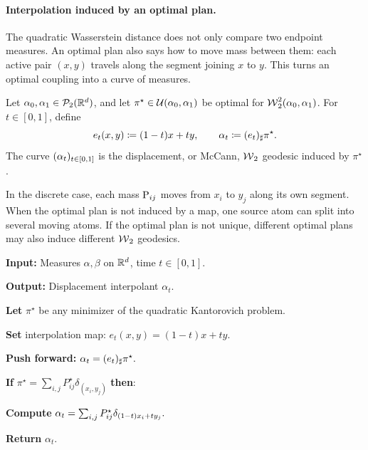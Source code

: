 \paragraph{Interpolation induced by an optimal plan.}
\label{sec-kantorovich-plan-interpolation}

The quadratic Wasserstein distance does not only compare two endpoint measures. An optimal plan also says how to move mass between them: each active pair $(x,y)$ travels along the segment joining $x$ to $y$. This turns an optimal coupling into a curve of measures.

\begin{defn}\label{def-w2-geodesic-induced-by-plan}
	Let $\al_0,\al_1\in\Pp_2(\RR^d)$, and let $\pi^\star\in\Couplings(\al_0,\al_1)$ be optimal for $\Wass_2^2(\al_0,\al_1)$. For $t\in[0,1]$, define
	\[
		e_t(x,y)\eqdef(1-t)x+t y,
		\qquad
		\al_t\eqdef(e_t)_\sharp\pi^\star .
	\]
	The curve $(\al_t)_{t\in[0,1]}$ is the displacement, or McCann, $\Wass_2$ geodesic induced by $\pi^\star$.
\end{defn}
In the discrete case, each mass $\P_{ij}$ moves from $x_i$ to $y_j$ along its own segment. When the optimal plan is not induced by a map, one source atom can split into several moving atoms. If the optimal plan is not unique, different optimal plans may also induce different $\Wass_2$ geodesics.

\begin{alg}\label{alg:plan-displacement-interpolation}
\textbf{Input:} Measures $\alpha,\beta$ on $\RR^d$, time $t\in[0,1]$.

\textbf{Output:} Displacement interpolant $\alpha_t$.

\textbf{Let} $\pi^\star$ be any minimizer of the quadratic Kantorovich problem.

\textbf{Set} interpolation map:
\(e_t(x,y)=(1-t)x+t y.\)

\textbf{Push forward:}
\(\al_t=(e_t)_\sharp\pi^\star.\)

\textbf{If} $\pi^\star=\sum_{i,j}P^\star_{ij}\delta_{(x_i,y_j)}$ \textbf{then}:
\begin{algblock}

\textbf{Compute}
\(\al_t= \sum_{i,j}P^\star_{ij} \delta_{(1-t)x_i+t y_j}.\)
\end{algblock}
\algreturnskip
\textbf{Return} $\alpha_t$.
\end{alg}

